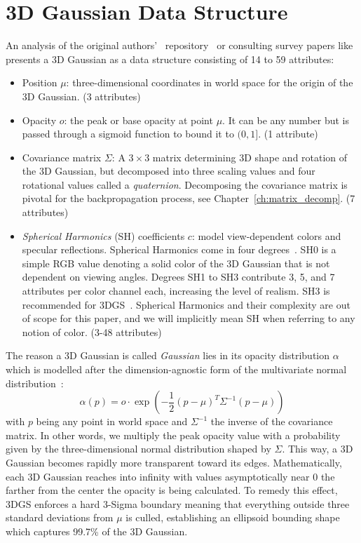 \section{3D Gaussian Data Structure}
\label{ch:gaussian}
An analysis of the original authors'~\cite{kerbl3DGaussianSplatting2023} repository~\cite{kerblRepo} or consulting survey papers like~\cite{bagdasarian3DGSzipSurvey3D2025} presents a 3D Gaussian as a data structure consisting of 14 to 59 attributes:

\begin{itemize}
    \item Position $\mu$: three-dimensional coordinates in world space for the origin of the 3D Gaussian. (3 attributes)
    \item Opacity $o$: the peak or base opacity at point $\mu$. It can be any number but is passed through a sigmoid function to bound it to $(0,1]$. (1 attribute)
    \item Covariance matrix $\Sigma$: A $3\times 3$ matrix determining 3D shape and rotation of the 3D Gaussian, but decomposed into three scaling values and four rotational values called a \textit{quaternion}. Decomposing the covariance matrix is pivotal for the backpropagation process, see Chapter~\ref{ch:matrix_decomp}. (7 attributes)
    \item \textit{Spherical Harmonics} (SH) coefficients $c$: model view-dependent colors and specular reflections. Spherical Harmonics come in four degrees~\cite{plenoctrees}. SH0 is a simple RGB value denoting a solid color of the 3D Gaussian that is not dependent on viewing angles. Degrees SH1 to SH3 contribute 3, 5, and 7 attributes per color channel each,  increasing the level of realism. SH3 is recommended for 3DGS~\cite{kerbl3DGaussianSplatting2023}. Spherical Harmonics and their complexity are out of scope for this paper, and we will implicitly mean SH when referring to any notion of color. (3-48 attributes)
\end{itemize}
The reason a 3D Gaussian is called \textit{Gaussian} lies in its opacity distribution $\alpha$ which is modelled after the dimension-agnostic form of the multivariate normal distribution~\cite{zwickerSurfaceSplatting2001}: $$ \alpha(p) = o \cdot \exp\left(-\frac{1}{2}(p - \mu)^T \Sigma^{-1}(p - \mu)\right) $$ with $p$ being any point in world space and $\Sigma^{-1}$ the inverse of the covariance matrix.
In other words, we multiply the peak opacity value with a probability given by the three-dimensional normal distribution shaped by $\Sigma$. This way, a 3D Gaussian becomes rapidly more transparent toward its edges. Mathematically, each 3D Gaussian reaches into infinity with values asymptotically near 0 the farther from the center the opacity is being calculated. 
To remedy this effect, 3DGS enforces a hard 3-Sigma boundary meaning that everything outside three standard deviations from $\mu$ is culled, establishing an ellipsoid bounding shape which captures 99.7\% of the 3D Gaussian.

